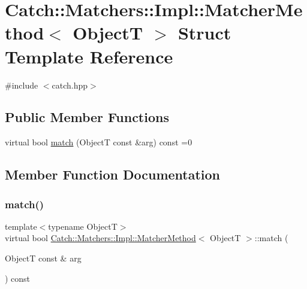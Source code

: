 \hypertarget{struct_catch_1_1_matchers_1_1_impl_1_1_matcher_method}{}\section{Catch\+::Matchers\+::Impl\+::Matcher\+Method$<$ ObjectT $>$ Struct Template Reference}
\label{struct_catch_1_1_matchers_1_1_impl_1_1_matcher_method}


{\ttfamily \#include $<$catch.\+hpp$>$}

\subsection*{Public Member Functions}
\begin{DoxyCompactItemize}
\item 
virtual bool \mbox{\hyperlink{struct_catch_1_1_matchers_1_1_impl_1_1_matcher_method_ae0920ff9e817acf08e1bb0cbcb044e30}{match}} (ObjectT const \&arg) const =0
\end{DoxyCompactItemize}


\subsection{Member Function Documentation}
\mbox{\label{struct_catch_1_1_matchers_1_1_impl_1_1_matcher_method_ae0920ff9e817acf08e1bb0cbcb044e30}} 
\subsubsection{\texorpdfstring{match()}{match()}}
{\footnotesize\ttfamily template$<$typename ObjectT$>$ \\
virtual bool \mbox{\hyperlink{struct_catch_1_1_matchers_1_1_impl_1_1_matcher_method}{Catch\+::\+Matchers\+::\+Impl\+::\+Matcher\+Method}}$<$ ObjectT $>$\+::match (\begin{DoxyParamCaption}\item[{ObjectT const \&}]{arg }\end{DoxyParamCaption}) const\hspace{0.3cm}{\ttfamily [pure virtual]}}



